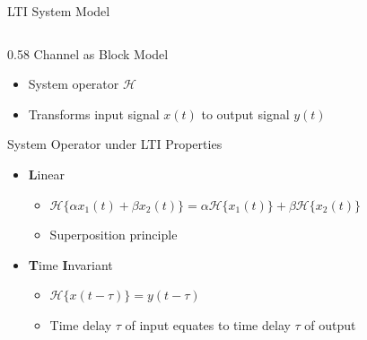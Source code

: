 \begin{frame}{LTI System Model}
    \begin{columns}[T,onlytextwidth]
        \begin{column}{0.58\textwidth}
            Channel as Block Model\\
            \vspace{1em}
            \begin{itemize}
                \item System operator $\mathcal{H}$ 
                \item Transforms input signal $x(t)$ to output signal $y(t)$
            \end{itemize}
            \vfill
            System Operator under LTI Properties\\
            \begin{itemize}
                \item \textbf{L}inear 
                \begin{itemize}
                    \item $\mathcal{H}\{\alpha x_1(t) + \beta x_2(t)\} = \alpha \mathcal{H}\{x_1(t)\} + \beta \mathcal{H}\{x_2(t)\}$
                    \item Superposition principle
                \end{itemize}
                \item \textbf{T}ime \textbf{I}nvariant 
                \begin{itemize}
                    \item $\mathcal{H}\{x(t - \tau)\}=y(t-\tau)$
                    \item Time delay $\tau$ of input equates to time delay $\tau$ of output
                \end{itemize}
            \end{itemize}

\end{column}
\end{columns}
\end{frame}
